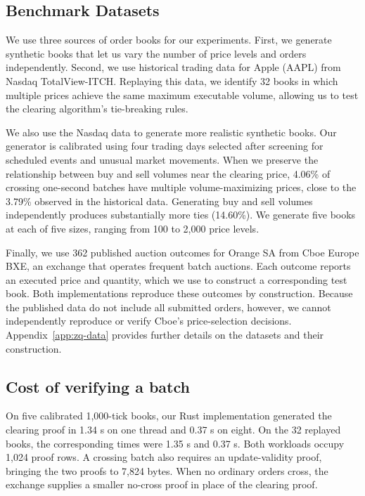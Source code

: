 \subsection{Benchmark Datasets}
\label{sec:zq-books}

We use three sources of order books for our experiments. First, we generate synthetic books that let us vary the number of price levels and orders independently. Second, we use historical trading data for Apple (AAPL) from Nasdaq TotalView-ITCH. Replaying this data, we identify 32 books in which multiple prices achieve the same maximum executable volume, allowing us to test the clearing algorithm's tie-breaking rules.

We also use the Nasdaq data to generate more realistic synthetic books. Our generator is calibrated using four trading days selected after screening for scheduled events and unusual market movements. When we preserve the relationship between buy and sell volumes near the clearing price, 4.06\% of crossing one-second batches have multiple volume-maximizing prices, close to the 3.79\% observed in the historical data. Generating buy and sell volumes independently produces substantially more ties (14.60\%). We generate five books at each of five sizes, ranging from 100 to 2,000 price levels.

Finally, we use 362 published auction outcomes for Orange SA from Cboe Europe BXE, an exchange that operates frequent batch auctions. Each outcome reports an executed price and quantity, which we use to construct a corresponding test book. Both implementations reproduce these outcomes by construction. Because the published data do not include all submitted orders, however, we cannot independently reproduce or verify Cboe's price-selection decisions. Appendix~\ref{app:zq-data} provides further details on the datasets and their construction.

\subsection{Cost of verifying a batch}
\label{sec:zq-cost}

On five calibrated 1,000-tick books, our Rust implementation generated the clearing proof in 1.34 s on one thread and 0.37 s on eight. On the 32 replayed books, the corresponding times were 1.35 s and 0.37 s. Both workloads occupy 1,024 proof rows. A crossing batch also requires an update-validity proof, bringing the two proofs to 7,824 bytes. When no ordinary orders cross, the exchange supplies a smaller no-cross proof in place of the clearing proof.

